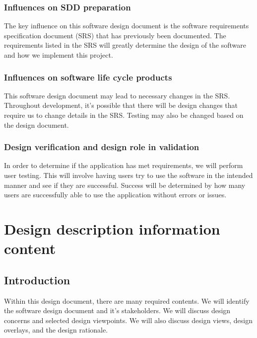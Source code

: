 \documentclass[letterpaper,10pt,draftclsnofoot,onecolumn,titlepage]{IEEEtran}
\begin{document}
			\subsubsection{Influences on SDD preparation}
				The key influence on this software design document is the software requirements specification document (SRS) that has previously been documented.
				The requirements listed in the SRS will greatly determine the design of the software and how we implement this project.

			\subsubsection{Influences on software life cycle products}
				This software design document may lead to necessary changes in the SRS.
				Throughout development, it's possible that there will be design changes that require us to change details in the SRS.
				Testing may also be changed based on the design document.

			\subsubsection{Design verification and design role in validation}
				In order to determine if the application has met requirements, we will perform user testing.
				This will involve having users try to use the software in the intended manner and see if they are successful.
				Success will be determined by how many users are successfully able to use the application without errors or issues.

	\section{Design description information content}

		\subsection{Introduction}
			Within this design document, there are many required contents.
			We will identify the software design document and it's stakeholders.
			We will discuss design concerns and selected design viewpoints.
			We will also discuss design views, design overlays, and the design rationale.
\end{document}
